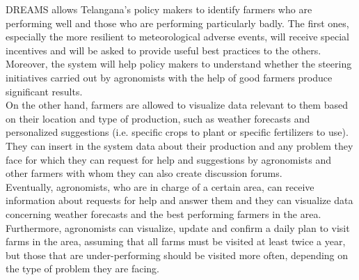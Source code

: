 DREAMS allows Telangana’s policy makers to  identify farmers who are performing well and those who are performing particularly badly. The first ones, especially the more resilient to meteorological adverse events, will receive special incentives and will be asked to provide useful best practices to the others. Moreover, the system will help policy makers to understand whether the steering initiatives carried out by agronomists with the help of good farmers produce significant results.\\

On the other hand, farmers are allowed to visualize data relevant to them based on their location and type of production, such as weather forecasts and personalized suggestions (i.e. specific crops to plant or specific fertilizers to use). They can insert in the system data about their production and any problem they face for which they can request for help and suggestions by agronomists and other farmers with whom they can also create discussion forums.\\

Eventually, agronomists, who are in charge of a certain area, can receive information about requests for help and answer them and they can visualize data concerning weather forecasts and the best performing farmers in the area. Furthermore, agronomists can visualize, update and confirm a daily plan to visit farms in the area, assuming that all farms must be visited at least twice a year, but those that are under-performing should be visited more often, depending on the type of problem they are facing.

